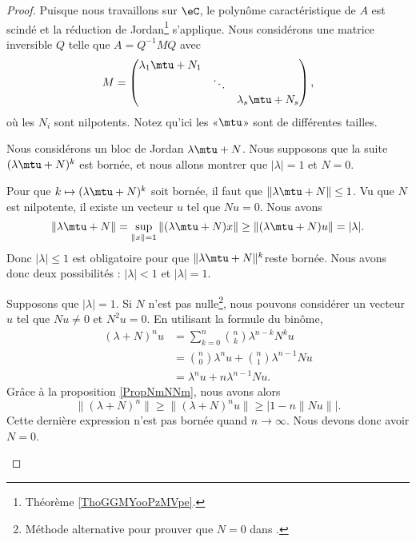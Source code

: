 \begin{proof}
	Puisque nous travaillons sur \( \eC\), le polynôme caractéristique de \( A\) est scindé et la réduction de Jordan\footnote{Théorème \ref{ThoGGMYooPzMVpe}.} s'applique. Nous considérons une matrice inversible \( Q\) telle que \( A=Q^{-1} MQ\) avec
	\begin{equation}
		M=\begin{pmatrix}
			\lambda_1\mtu+N_1 &        &                   \\
			                  & \ddots &                   \\
			                  &        & \lambda_s\mtu+N_s
		\end{pmatrix},
	\end{equation}
	où les \( N_i\) sont nilpotents. Notez qu'ici les «\( \mtu\)» sont de différentes tailles.

	\begin{subproof}
		Nous considérons un bloc de Jordan \( \lambda\mtu+N\). Nous supposons que la suite \( (\lambda\mtu+N)^k\) est bornée, et nous allons montrer que \( | \lambda |=1\) et \( N=0\).

		Pour que \( k\mapsto (\lambda \mtu+N)^k\) soit bornée, il faut que \( \| \lambda\mtu+N \|\leq 1\). Vu que \( N\) est nilpotente, il existe un vecteur \( u\) tel que \( Nu=0\). Nous avons
		\begin{equation}
			\| \lambda\mtu+N \|=\sup_{\| x \|=1}\| (\lambda\mtu+N)x \|\geq \| (\lambda\mtu+N)u \|=| \lambda |.
		\end{equation}
		Donc \( | \lambda |\leq 1\) est obligatoire pour que \( \| \lambda\mtu+N \|^k\)reste bornée. Nous avons donc deux possibilités : \( | \lambda |<1\) et \( | \lambda |=1\).

		Supposons que \( | \lambda |=1\). Si \( N\) n'est pas nulle\footnote{Méthode alternative pour prouver que \( N=0\) dans \cite{BIBooMJJZooWEKogX}.}, nous pouvons considérer un vecteur \( u\) tel que \( Nu\neq 0\) et \( N^2u=0\). En utilisant la formule du binôme,
		\begin{subequations}
			\begin{align}
				(\lambda+N)^nu & =\sum_{k=0}^n\binom{ n }{ k }\lambda^{n-k}N^ku              \\
				               & =\binom{ n }{ 0 }\lambda^nu+\binom{ n }{ 1 }\lambda^{n-1}Nu \\
				               & =\lambda^nu+n\lambda^{n-1}Nu.
			\end{align}
		\end{subequations}
		Grâce à la proposition \ref{PropNmNNm}, nous avons alors
		\begin{equation}
			\| (\lambda+N)^n \|\geq \| (\lambda+N)^nu \|\geq \big| 1-n\| Nu \| \big|.
		\end{equation}
		Cette dernière expression n'est pas bornée quand \( n\to \infty\). Nous devons donc avoir \( N=0\).


\end{subproof}
\end{proof}
